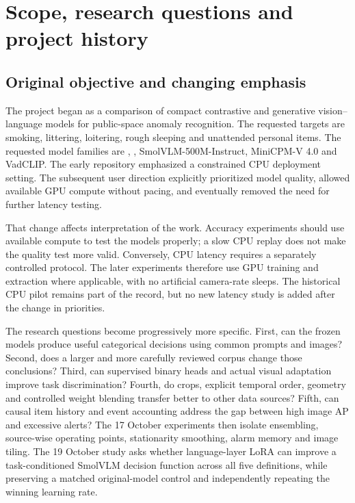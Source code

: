 \chapter{Scope, research questions and project history}
\label{ch:scope}
\section{Original objective and changing emphasis}
The project began as a comparison of compact contrastive and generative vision--language models for public-space anomaly recognition. The requested targets are smoking, littering, loitering, rough sleeping and unattended personal items. The requested model families are \modelm, \capstonesig, SmolVLM-500M-Instruct, MiniCPM-V 4.0 and VadCLIP. The early repository emphasized a constrained CPU deployment setting. The subsequent user direction explicitly prioritized model quality, allowed available GPU compute without pacing, and eventually removed the need for further latency testing.

That change affects interpretation of the work. Accuracy experiments should use available compute to test the models properly; a slow CPU replay does not make the quality test more valid. Conversely, CPU latency requires a separately controlled protocol. The later experiments therefore use GPU training and extraction where applicable, with no artificial camera-rate sleeps. The historical CPU pilot remains part of the record, but no new latency study is added after the change in priorities.

The research questions become progressively more specific. First, can the frozen models produce useful categorical decisions using common prompts and images? Second, does a larger and more carefully reviewed corpus change those conclusions? Third, can supervised binary heads and actual visual adaptation improve task discrimination? Fourth, do crops, explicit temporal order, geometry and controlled weight blending transfer better to other data sources? Fifth, can causal item history and event accounting address the gap between high image AP and excessive alerts? The 17 October experiments then isolate ensembling, source-wise operating points, stationarity smoothing, alarm memory and image tiling. The 19 October study asks whether language-layer LoRA can improve a task-conditioned SmolVLM decision function across all five definitions, while preserving a matched original-model control and independently repeating the winning learning rate.

